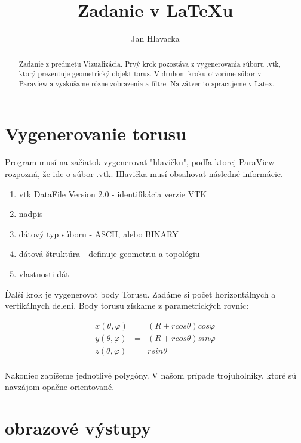 \documentclass[11pt, a4paper]{article}
\author{Jan Hlavacka}
\title{Zadanie v \LaTeX u}
\begin{document}
\maketitle
\newpage
\begin{abstract}
    Zadanie z predmetu Vizualizácia. Prvý krok pozostáva z vygenerovania
    súboru .vtk, ktorý prezentuje geometrický objekt torus. V druhom kroku
    otvoríme súbor v Paraview a vyskúšame rôzne zobrazenia a filtre. Na zátver
    to spracujeme v Latex.
\end{abstract}
\newpage
\tableofcontents
\newpage
\section{Vygenerovanie torusu}
Program musí na začiatok vygenerovať "hlavičku", podľa ktorej ParaView rozpozná, že ide o súbor .vtk. Hlavička musí obsahovať následné informácie.
\begin{enumerate}
    \item vtk DataFile Version 2.0 - identifikácia verzie VTK
    \item nadpis
    \item dátový typ súboru - ASCII, alebo BINARY
    \item dátová štruktúra - definuje geometriu a topológiu
    \item vlastnosti dát
\end{enumerate}
Ďalší krok je vygenerovať body Torusu. Zadáme si počet horizontálnych a vertikálnych delení.
Body torusu získame z parametrických rovníc:

\begin{center}
    \begin{eqnarray*}
        x(\theta,\varphi) &=& (R + r cos\theta)cos\varphi \\
        y(\theta,\varphi) &=& (R + r cos\theta)sin\varphi \\
        z(\theta,\varphi) &=& r sin\theta \\
    \end{eqnarray*}
\end{center}

Nakoniec zapíšeme jednotlivé polygóny. V našom prípade trojuholníky, ktoré sú navzájom opačne orientované.
\newpage
\section{obrazové výstupy}
\end{document}
